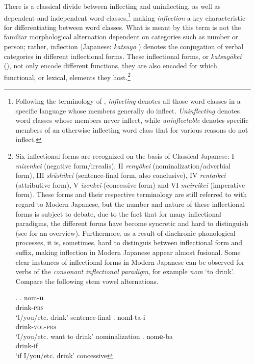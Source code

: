There is a classical divide between inflecting and uninflecting, as well as dependent and independent word classes,\footnote{Following the terminology of \citet{spencer:2020:uninflectedness}, \textit{inflecting} denotes all those word classes in a specific language whose members generally do inflect. \textit{Uninflecting} denotes word classes whose members never inflect, while \textit{uninflectable} denotes specific members of an otherwise inflecting word class that for various reasons do not inflect.} making \textit{inflection} a key characteristic for differentiating between word classes. What is meant by this term is not the familiar morphological alternation dependent on categories such as number or person; rather, inflection (Japanese: \textit{katsuyō} ) denotes the conjugation of verbal categories in different inflectional forms. These inflectional forms, or \textit{katsuyōkei} (), not only encode different functions, they are also encoded for which functional, or lexical, elements they host.\footnote{Six inflectional forms are recognized on the basis of Classical Japanese: I \textit{mizenkei}  (negative form/irrealis), II \textit{renyōkei}  (nominalization/adverbial form), III \textit{shūshikei}  (sentence-final form, also conclusive), IV \textit{rentaikei}  (attributive form), V \textit{izenkei}  (concessive form) and VI \textit{meireikei}  (imperative form). These forms and their respective terminology are still referred to with regard to Modern Japanese, but the number and nature of these inflectional forms is subject to debate, due to the fact that for many inflectional paradigms, the different forms have become syncretic and hard to distinguish (see \citealt{kohlich:2023:uninflecting} for an overview). Furthermore, as a result of diachronic phonological processes, it is, sometimes, hard to distinguis between inflectional form and suffix, making inflection in Modern Japanese appear almost fusional. Some clear instances of inflectional forms in Modern Japanese can be observed for verbs of the \textit{consonant inflectional paradigm}, for example \textit{nom} `to drink'. Compare the following stem vowel alternations.

\ex. \ag. nom-\textbf{u}\\
drink-\textsc{prs}\\
`I/you/etc. drink' \null \hfill sentence-final
\bg. nom\textbf{i}-ta-i\\
drink-\textsc{vol}-\textsc{prs}\\
`I/you/etc. want to drink' \null \hfill nominalization
\cg. nom\textbf{e}-ba\\
drink-if\\
`if I/you/etc. drink' \null \hfill concessive


}
